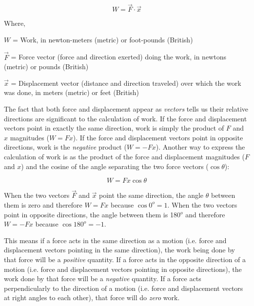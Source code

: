$$W = \vec{F} \cdot \vec{x}$$

\noindent
Where,

$W$ = Work, in newton-meters (metric) or foot-pounds (British)

$\vec{F}$ = Force vector (force and direction exerted) doing the work, in newtons (metric) or pounds (British)

$\vec{x}$ = Displacement vector (distance and direction traveled) over which the work was done, in meters (metric) or feet (British)

\vskip 10pt

\filbreak

The fact that both force and displacement appear as \textit{vectors} tells us their relative directions are significant to the calculation of work.  If the force and displacement vectors point in exactly the same direction, work is simply the product of $F$ and $x$ magnitudes ($W = Fx$).  If the force and displacement vectors point in opposite directions, work is the \textit{negative} product ($W = -Fx$).  Another way to express the calculation of work is as the product of the force and displacement magnitudes ($F$ and $x$) and the cosine of the angle separating the two force vectors ($\cos \theta$):

$$W = Fx \cos \theta$$

When the two vectors $\vec{F}$ and $\vec{x}$ point the same direction, the angle $\theta$ between them is zero and therefore $W = Fx$ because $\cos 0^{o} = 1$.  When the two vectors point in opposite directions, the angle between them is 180$^{o}$ and therefore $W = -Fx$ because $\cos 180^{o} = -1$.

\vskip 10pt

This means if a force acts in the same direction as a motion (i.e. force and displacement vectors pointing in the same direction), the work being done by that force will be a \textit{positive} quantity.  If a force acts in the opposite direction of a motion (i.e. force and displacement vectors pointing in opposite directions), the work done by that force will be a \textit{negative} quantity.  If a force acts perpendicularly to the direction of a motion (i.e. force and displacement vectors at right angles to each other), that force will do \textit{zero} work.

